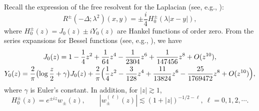 \documentclass[reqno]{amsart}
\numberwithin{equation}{section}
\begin{document}
Recall the expression of the free resolvent for the Laplacian (see, e.g., \cite{Erdogan-Green}):
\begin{equation}\label{resolvent-R}
	R^\pm (-\Delta;\lambda^2)(x,y) = \pm\frac{i}{4}H_0^\pm(\lambda|x-y|),
\end{equation}
where $H_0^\pm (z)= J_0(z)\pm i Y_0(z) $ are Hankel functions of order zero. From the series expansions for Bessel functions
(see, e.g., \cite{AS64}), we have
\begin{gather*}
    J_0(z)=1-\frac14z^2+\frac1{64}z^4-\frac1{2304}z^6+ \frac{1}{147456}z^8+O(z^{10}),\\
    Y_0(z)=\frac{2}{\pi}\bigl(\log\frac{z}{2}+\gamma\bigr)J_0(z)
          +\frac{2}{\pi}\Bigl(\frac14z^2-\frac3{128}z^4+\frac{11}{13824}z^6-\frac{25}{1769472}z^8+O(z^{10})\Bigr),
\end{gather*}
where $\gamma $ is Euler's constant. In addition, for $|z| \gtrsim 1$,
\begin{equation}\label{id-H0big}
H^\pm_0(z)=e^{\pm iz}w_\pm(z),\qquad |w_\pm^{(\ell)}(z)|\lesssim(1+|z|)^{-1/2-\ell}, \
\ell= 0,1,2,\cdots.
\end{equation}
\end{document}
